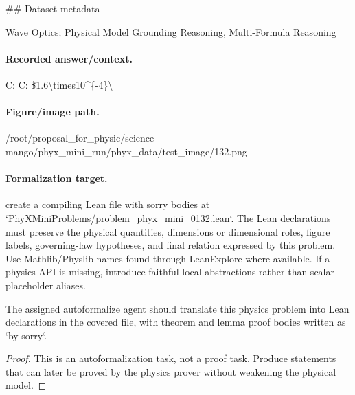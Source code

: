 \#\# Dataset metadata

Wave Optics; Physical Model Grounding Reasoning, Multi-Formula Reasoning

\paragraph{Recorded answer/context.}
C: C: \$1.6\textbackslash{}times10\textasciicircum{}\{-4\}\textbackslash{}

\paragraph{Figure/image path.}
/root/proposal\_for\_physic/science-mango/phyx\_mini\_run/phyx\_data/test\_image/132.png

\paragraph{Formalization target.}
create a compiling Lean file with sorry bodies at `PhyXMiniProblems/problem\_phyx\_mini\_0132.lean`. The Lean declarations must preserve the physical quantities, dimensions or dimensional roles, figure labels, governing-law hypotheses, and final relation expressed by this problem.
Use Mathlib/Physlib names found through LeanExplore where available. If a physics API is missing, introduce faithful local abstractions rather than scalar placeholder aliases.

\begin{theorem}
\label{thm:physics:phyx_mini_0132:target}
The assigned autoformalize agent should translate this physics problem into Lean declarations in the covered file, with theorem and lemma proof bodies written as `by sorry`.
\end{theorem}
\begin{proof}
This is an autoformalization task, not a proof task. Produce statements that can later be proved by the physics prover without weakening the physical model.
\end{proof}

